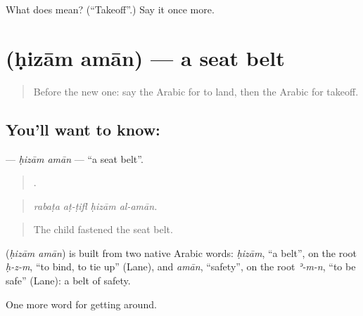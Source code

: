 \begin{tcolorbox}[breakable,colback=teal!4,colframe=teal!35!black,title={Before you move on}]
What does  mean? (\textquotedblleft{}Takeoff\textquotedblright{}.) Say it once more.
\end{tcolorbox}
\section[\texorpdfstring{\ar{حزام} \ar{أمان} (ḥizām amān)}{حزام أمان (ḥizām amān)}]{  (ḥizām amān) — a seat belt}

\label{lesson:AR-C424-hizam-aman}



\begin{quote}
Before the new one: say the Arabic for to land, then the Arabic for takeoff.
\end{quote}

\subsection*{You'll want to know:  }
\textbf{ } — \emph{ḥizām amān} — \textquotedblleft{}a seat belt\textquotedblright{}.

\begin{quote}
   .
\end{quote}

\begin{quote}
\emph{rabaṭa aṭ-ṭifl ḥizām al-amān.}
\end{quote}

\begin{quote}
The child fastened the seat belt.
\end{quote}

\begin{cousinweb}
\textbf{ } (\emph{ḥizām amān}) is built from two native Arabic words: \emph{ḥizām}, \textquotedblleft{}a belt\textquotedblright{}, on the root \emph{ḥ-z-m}, \textquotedblleft{}to bind, to tie up\textquotedblright{} (Lane), and \emph{amān}, \textquotedblleft{}safety\textquotedblright{}, on the root \emph{ʾ-m-n}, \textquotedblleft{}to be safe\textquotedblright{} (Lane): a belt of safety.
\end{cousinweb}

\begin{grammarlens}[title={What you've built}]
One more word for getting around.
\end{grammarlens}


